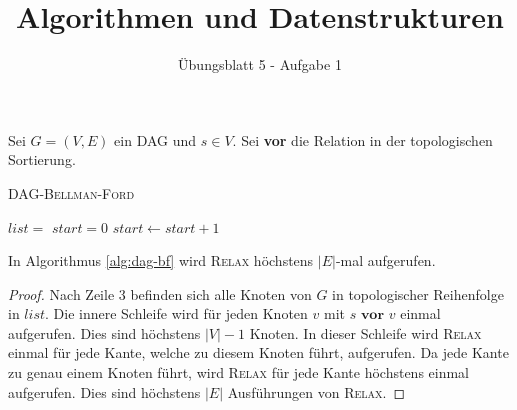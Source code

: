 \documentclass[a4paper]{scrartcl}
\title{Algorithmen und Datenstrukturen}
\subtitle{Übungsblatt 5 - Aufgabe 1}
\author{}
\begin{document}

Sei $G = (V, E)$ ein DAG und $s \in V$.
Sei \textbf{vor} die Relation in der topologischen Sortierung.

    \textsc{DAG-Bellman-Ford}
    \label{alg:dag-bf}
    \begin{algorithmic}[1]
            \State {}
            \State $list = $
            \State $start = 0$
                \State $start \gets start + 1$
            \EndWhile
                    \State {}
                \EndFor
            \EndFor
        \EndProcedure
    \end{algorithmic}

\begin{behaupt}
    In Algorithmus \ref{alg:dag-bf} wird \textsc{Relax} höchstens $|E|$-mal
    aufgerufen.
\end{behaupt}
\begin{proof}
    Nach Zeile 3 befinden sich alle Knoten von $G$ in topologischer Reihenfolge
    in $list$.
    Die innere Schleife wird für jeden Knoten $v$ mit $s \textbf{ vor } v$
    einmal aufgerufen.
    Dies sind höchstens $|V| - 1$ Knoten.
    In dieser Schleife wird \textsc{Relax} einmal für jede Kante, welche zu
    diesem Knoten führt, aufgerufen.
    Da jede Kante zu genau einem Knoten führt, wird \textsc{Relax} für jede
    Kante höchstens einmal aufgerufen.
    Dies sind höchstens $|E|$ Ausführungen von \textsc{Relax}.
\end{proof}
\end{document}
